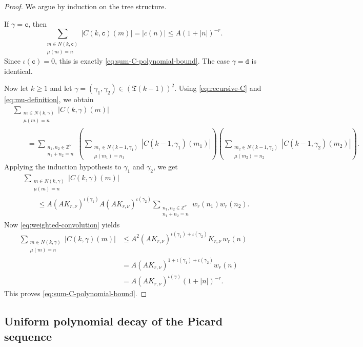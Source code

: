 \documentclass[12pt,reqno,tbtags]{amsart}
\newcommand\1{\mathbbm{1}}
\begin{document}
\begin{proof}
We argue by induction on the tree structure.

If $\gamma=\mathtt c$, then
\[
\sum_{\substack{m\in N(k,\mathtt c)\\ \mu(m)=n}}
|C(k,\mathtt c)(m)|
=
|c(n)|
\le
A(1+|n|)^{-r}.
\]
Since $\iota(\mathtt c)=0$, this is exactly \eqref{eq:sum-C-polynomial-bound}.
The case $\gamma=\mathtt d$ is identical.

Now let $k\ge1$ and let $\gamma=(\gamma_1,\gamma_2)\in(\mathfrak T(k-1))^2$.
Using \eqref{eq:recursive-C} and \eqref{eq:mu-definition}, we obtain
\begin{align*}
&\sum_{\substack{m\in N(k,\gamma)\\ \mu(m)=n}}
|C(k,\gamma)(m)| \\
&\qquad=
\sum_{\substack{n_1,n_2\in\mathbb Z^\nu\\ n_1+n_2=n}}
\left(
\sum_{\substack{m_1\in N(k-1,\gamma_1)\\ \mu(m_1)=n_1}}
|C(k-1,\gamma_1)(m_1)|
\right)
\left(
\sum_{\substack{m_2\in N(k-1,\gamma_2)\\ \mu(m_2)=n_2}}
|C(k-1,\gamma_2)(m_2)|
\right).
\end{align*}
Applying the induction hypothesis to $\gamma_1$ and $\gamma_2$, we get
\begin{align*}
&\sum_{\substack{m\in N(k,\gamma)\\ \mu(m)=n}}
|C(k,\gamma)(m)| \\
&\qquad\le
A(AK_{r,\nu})^{\iota(\gamma_1)}
A(AK_{r,\nu})^{\iota(\gamma_2)}
\sum_{\substack{n_1,n_2\in\mathbb Z^\nu\\ n_1+n_2=n}}
w_r(n_1)w_r(n_2).
\end{align*}
Now \eqref{eq:weighted-convolution} yields
\begin{align*}
\sum_{\substack{m\in N(k,\gamma)\\ \mu(m)=n}}
|C(k,\gamma)(m)|
&\le
A^2 (AK_{r,\nu})^{\iota(\gamma_1)+\iota(\gamma_2)}
K_{r,\nu}\,w_r(n) \\
&=
A(AK_{r,\nu})^{1+\iota(\gamma_1)+\iota(\gamma_2)}w_r(n) \\
&=
A(AK_{r,\nu})^{\iota(\gamma)}(1+|n|)^{-r}.
\end{align*}
This proves \eqref{eq:sum-C-polynomial-bound}.
\end{proof}

\subsection{Uniform polynomial decay of the Picard sequence}
\end{document}
